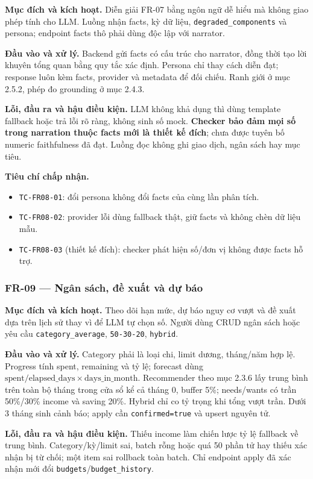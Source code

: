 \textbf{Mục đích và kích hoạt.} Diễn giải FR-07 bằng ngôn ngữ dễ hiểu mà không giao phép tính cho LLM. Luồng nhận facts, kỳ dữ liệu, \texttt{degraded\_components} và persona; endpoint facts thô phải dùng độc lập với narrator.

\textbf{Đầu vào và xử lý.} Backend gửi facts có cấu trúc cho narrator, đồng thời tạo lời khuyên tổng quan bằng quy tắc xác định. Persona chỉ thay cách diễn đạt; response luôn kèm facts, provider và metadata để đối chiếu. Ranh giới ở mục 2.5.2, phép đo grounding ở mục 2.4.3.

\textbf{Lỗi, đầu ra và hậu điều kiện.} LLM không khả dụng thì dùng template fallback hoặc trả lỗi rõ ràng, không sinh số mock. \textbf{Checker bảo đảm mọi số trong narration thuộc facts mới là thiết kế đích}; chưa được tuyên bố numeric faithfulness đã đạt. Luồng đọc không ghi giao dịch, ngân sách hay mục tiêu.

\textbf{Tiêu chí chấp nhận.}
\begin{itemize}
  \item \texttt{TC-FR08-01}: đổi persona không đổi facts của cùng lần phân tích.
  \item \texttt{TC-FR08-02}: provider lỗi dùng fallback thật, giữ facts và không chèn dữ liệu mẫu.
  \item \texttt{TC-FR08-03} (thiết kế đích): checker phát hiện số/đơn vị không được facts hỗ trợ.
\end{itemize}

\subsubsection{FR-09 --- Ngân sách, đề xuất và dự báo}

\textbf{Mục đích và kích hoạt.} Theo dõi hạn mức, dự báo nguy cơ vượt và đề xuất dựa trên lịch sử thay vì để LLM tự chọn số. Người dùng CRUD ngân sách hoặc yêu cầu \texttt{category\_average}, \texttt{50-30-20}, \texttt{hybrid}.

\textbf{Đầu vào và xử lý.} Category phải là loại chi, limit dương, tháng/năm hợp lệ. Progress tính spent, remaining và tỷ lệ; forecast dùng $\text{spent}/\text{elapsed\_days}\times\text{days\_in\_month}$. Recommender theo mục 2.3.6 lấy trung bình trên toàn bộ tháng trong cửa sổ kể cả tháng 0, buffer 5\%; needs/wants có trần 50\%/30\% income và saving 20\%. Hybrid chỉ co tỷ trọng khi tổng vượt trần. Dưới 3 tháng sinh cảnh báo; apply cần \texttt{confirmed=true} và upsert nguyên tử.

\textbf{Lỗi, đầu ra và hậu điều kiện.} Thiếu income làm chiến lược tỷ lệ fallback về trung bình. Category/kỳ/limit sai, batch rỗng hoặc quá 50 phần tử hay thiếu xác nhận bị từ chối; một item sai rollback toàn batch. Chỉ endpoint apply đã xác nhận mới đổi \texttt{budgets}/\texttt{budget\_history}.

